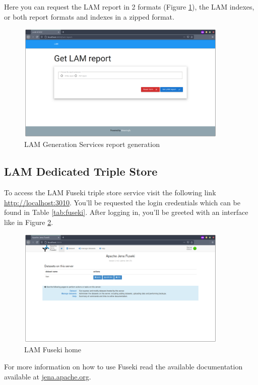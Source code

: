 Here you can request the LAM report in 2 formats (Figure \ref{fig:lam-generation-ui-report}), the LAM indexes, or both report formats and indexes in a zipped format.

\begin{figure}[H]
  \centering
  \includegraphics[width=0.9\textwidth]{images/usage/lam-generation-ui-report.png}
  \caption{LAM Generation Services report generation}
  \label{fig:lam-generation-ui-report}
\end{figure} 

\subsection{LAM Dedicated Triple Store}
To access the LAM Fuseki triple store service visit the following link \url{http://localhost:3010}. You'll be requested the login credentials which can be found in Table \ref{tab:fuseki}. After logging in, you'll be greeted with an interface like in Figure \ref{fig:lam-fuseki-home}.

\begin{figure}[H]
  \centering
  \includegraphics[width=0.9\textwidth]{images/usage/fuseki-home.png}
  \caption{LAM Fuseki home}
  \label{fig:lam-fuseki-home}
\end{figure} 

For more information on how to use Fuseki read the available documentation available at \href{https://jena.apache.org/documentation/fuseki2/}{jena.apache.org}.